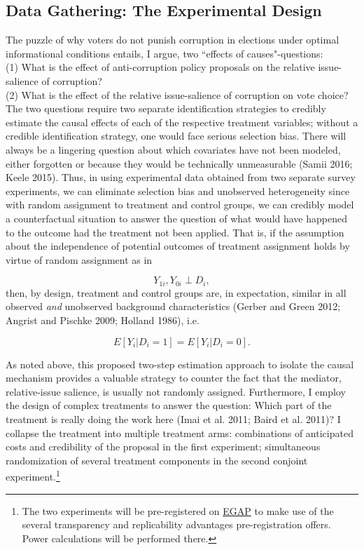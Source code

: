 \documentclass[11pt]{article}
\begin{document}
\subsection{Data Gathering: The Experimental Design}
The puzzle of why voters do not punish corruption in elections under optimal informational conditions entails, I argue, two “effects of causes"-questions: \\
(1) What is the effect of anti-corruption policy proposals on the relative issue-salience of corruption?\\
(2) What is the effect of the relative issue-salience of corruption on vote choice?\\
The two questions require two separate identification strategies to credibly estimate the causal effects of each of the respective treatment variables; without a credible identification strategy, one would face serious selection bias. There will always be a lingering question about which covariates have not been modeled, either forgotten or because they would be technically unmeasurable (Samii 2016; Keele 2015). Thus, in using experimental data obtained from two separate survey experiments, we can eliminate selection bias and unobserved heterogeneity since with random assignment to treatment and control groups, we can credibly model a counterfactual situation to answer the question of what would have happened to the outcome had the treatment not been applied. That is, if the assumption about the independence of potential outcomes of treatment assignment holds by virtue of random assignment as in

\begin{equation}
Y_{1i}, Y_{0i} \perp D_i,
\end{equation}
then, by design, treatment and control groups are, in expectation, similar in all observed \textit{and} unobserved background characteristics (Gerber and Green 2012; Angrist and Pischke 2009; Holland 1986), i.e.

\begin{equation}
E[Y_i | D_i = 1] = E[Y_i | D_i = 0].
\end{equation}

As noted above, this proposed two-step estimation approach to isolate the causal mechanism provides a valuable strategy to counter the fact that the mediator, relative-issue salience, is usually not randomly assigned. Furthermore, I employ the design of complex treatments to answer the question: Which part of the treatment is really doing the work here (Imai et al. 2011; Baird et al. 2011)? I collapse the treatment into multiple treatment arms: combinations of anticipated costs and credibility of the proposal in the first experiment; simultaneous randomization of several treatment components in the second conjoint experiment.\footnote{The two experiments will be pre-registered on \href{http://egap.org/}{EGAP} to make use of the several transparency and replicability advantages pre-registration offers. Power calculations will be performed there.}
\end{document}
